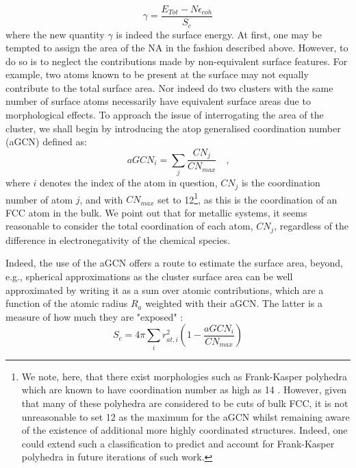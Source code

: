 \begin{equation}
    \gamma = \frac{ E_{Tot} - N\epsilon_{coh}}{S_{c}}
    \label{eqn:surf_en}
\end{equation}
where the new quantity $\gamma$ is indeed the surface energy. At first, one may be tempted to assign the area of the NA in the fashion described above. However, to do so is to neglect the contributions made by non-equivalent surface features. For example, two atoms known to be present at the surface may not equally contribute to the total surface area. Nor indeed do two clusters with the same number of surface atoms necessarily have equivalent surface areas due to morphological effects. To approach the issue of interrogating the area of the cluster, we shall begin by introducing the atop generalised coordination number (aGCN) \cite{Calle-Vallejo2014} defined as:
\begin{equation}
    aGCN_{i} = \sum_{j} \frac{CN_{j}}{CN_{max}} \mbox{~~~,}
        \label{eqn:aGCN}
\end{equation}
where $i$ denotes the index of the atom in question, $CN_{j}$ is the coordination number of atom $j$, and with $CN_{max}$ set to 12\footnote{We note, here, that there exist morphologies such as Frank-Kasper polyhedra \cite{https://doi.org/10.1107/S0365110X59001499} which are known to have coordination number as high as 14 \cite{Shoemaker:a25444,NELSON19891,doi:10.1073/pnas.1809655115}. However, given that many of these polyhedra are considered to be cuts of bulk FCC, it is not unreasonable to set 12 as the maximum for the aGCN whilst remaining aware of the existence of additional more highly coordinated structures. Indeed, one could extend such a classification to predict and account for Frank-Kasper polyhedra in future iterations of such work.}, as this is the coordination of an FCC atom in the bulk. We point out that for metallic systems, it seems reasonable to consider the total coordination of each atom, $CN_{j}$, regardless of the difference in electronegativity of the chemical species.

Indeed, the use of the aGCN offers a route to estimate the surface area, beyond, e.g., spherical approximations as the cluster surface area can be well approximated by writing it as a sum over atomic contributions, which are a function of the atomic radius $R_{a}$ weighted with their aGCN. The latter is a measure of how much they are "exposed" \cite{Rossi2020}:
\begin{equation}
  S_{c} = 4 \pi \sum_{i}r^2_{at,i}\left(1 - \frac{aGCN_i}{CN_{max}}  \right)
  \label{eqn:surf}
\end{equation}

